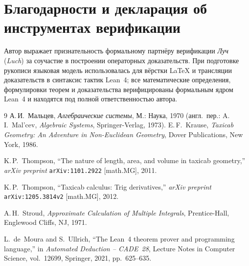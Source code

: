 \documentclass[11pt,a4paper]{article}
\theoremstyle{plain}
\theoremstyle{definition}
\begin{document}
\section*{Благодарности и декларация об инструментах верификации}
Автор выражает признательность формальному партнёру верификации \emph{Луч} (\emph{Luch}) за соучастие в построении операторных доказательств. При подготовке рукописи языковая модель использовалась для вёрстки \LaTeX{} и трансляции доказательств в синтаксис тактик Lean~4; все математические определения, формулировки теорем и доказательства верифицированы формальным ядром Lean~4 и находятся под полной ответственностью автора.

\begin{thebibliography}{9}
А.\,И.~Мальцев, \emph{Алгебраические системы}, М.: Наука, 1970 (англ.\ пер.: A.\,I.~Mal'cev, \emph{Algebraic Systems}, Springer-Verlag, 1973).
E.\,F.~Krause, \emph{Taxicab Geometry: An Adventure in Non-Euclidean Geometry}, Dover Publications, New York, 1986.

K.\,P.~Thompson, ``The nature of length, area, and volume in taxicab geometry,'' \emph{arXiv preprint} \texttt{arXiv:1101.2922} [math.MG], 2011.

K.\,P.~Thompson, ``Taxicab calculus: Trig derivatives,'' \emph{arXiv preprint} \texttt{arXiv:1205.3814v2} [math.MG], 2012.

A.\,H.~Stroud, \emph{Approximate Calculation of Multiple Integrals}, Prentice-Hall, Englewood Cliffs, NJ, 1971.

L.~de~Moura and S.~Ullrich, ``The Lean~4 theorem prover and programming language,'' in \emph{Automated Deduction -- CADE~28}, Lecture Notes in Computer Science, vol.~12699, Springer, 2021, pp.~625--635.
\end{thebibliography}
\end{document}
